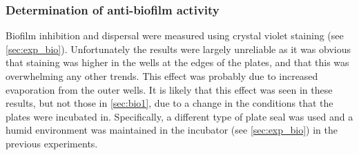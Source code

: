 \subsubsection{Determination of anti-biofilm activity}

Biofilm inhibition and dispersal were measured using crystal violet staining  (see \ref{sec:exp_bio}). Unfortunately the results were largely unreliable as it was obvious that staining was higher in the wells at the edges of the plates, and that this was overwhelming any other trends. This effect was probably due to increased evaporation from the outer wells. 
It is likely that this effect was seen in these results, but not those in \ref{sec:bio1}, due to a change in the conditions that the plates were incubated in. Specifically, a different type of plate seal was used and a humid environment was maintained in the incubator (see \ref{sec:exp_bio}) in the previous experiments.
